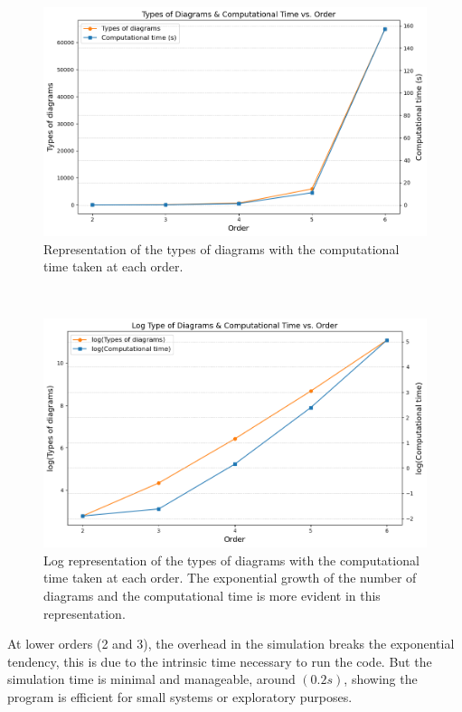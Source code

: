\documentclass[11pt,a4paper,twoside,pdf]{article}
\numberwithin{equation}{section}
\begin{document}
\begin{figure}[h!]
    \centering
    \centering
    \includegraphics[width=\textwidth]{plots/performance.png}
    \caption{Representation of the types of diagrams with the computational time taken at
    each order.}
    \label{fig:performance}
\end{figure}
~
\begin{figure}[h!]
    \centering
    \centering
    \includegraphics[width=\textwidth]{plots/performace_log.png}
    \caption{Log representation of the types of diagrams with the computational time taken at
    each order. The exponential growth of the number of diagrams and the computational time
    is more evident in this representation.}
    \label{fig:performance_log}
\end{figure}

\newpage

At lower orders (2 and 3), the overhead in the simulation breaks the exponential tendency,
this is due to the intrinsic time necessary to run the code. 
But the simulation time is minimal and manageable, around $( 0.2 s)$, 
showing the program is efficient for small systems or exploratory purposes.
\end{document}
